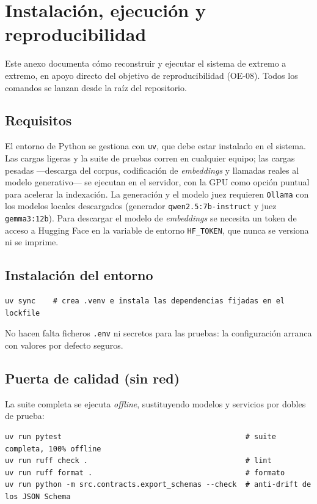 \chapter{Instalación, ejecución y reproducibilidad}
\label{app:instalacion}

Este anexo documenta cómo reconstruir y ejecutar el sistema de extremo a extremo, en apoyo directo del objetivo de reproducibilidad (OE-08). Todos los comandos se lanzan desde la raíz del repositorio.

\section{Requisitos}
\label{sec:app-requisitos}

El entorno de Python se gestiona con \texttt{uv}, que debe estar instalado en el sistema. Las cargas ligeras y la suite de pruebas corren en cualquier equipo; las cargas pesadas —descarga del corpus, codificación de \emph{embeddings} y llamadas reales al modelo generativo— se ejecutan en el servidor, con la GPU como opción puntual para acelerar la indexación. La generación y el modelo juez requieren \texttt{Ollama} con los modelos locales descargados (generador \texttt{qwen2.5:7b-instruct} y juez \texttt{gemma3:12b}). Para descargar el modelo de \emph{embeddings} se necesita un token de acceso a Hugging Face en la variable de entorno \texttt{HF\_TOKEN}, que nunca se versiona ni se imprime.

\section{Instalación del entorno}
\label{sec:app-instalacion}

\begin{lstlisting}
uv sync    # crea .venv e instala las dependencias fijadas en el lockfile
\end{lstlisting}

No hacen falta ficheros \texttt{.env} ni secretos para las pruebas: la configuración arranca con valores por defecto seguros.

\section{Puerta de calidad (sin red)}
\label{sec:app-calidad}

La suite completa se ejecuta \emph{offline}, sustituyendo modelos y servicios por dobles de prueba:

\begin{lstlisting}
uv run pytest                                          # suite completa, 100% offline
uv run ruff check .                                    # lint
uv run ruff format .                                   # formato
uv run python -m src.contracts.export_schemas --check  # anti-drift de los JSON Schema
\end{lstlisting}

